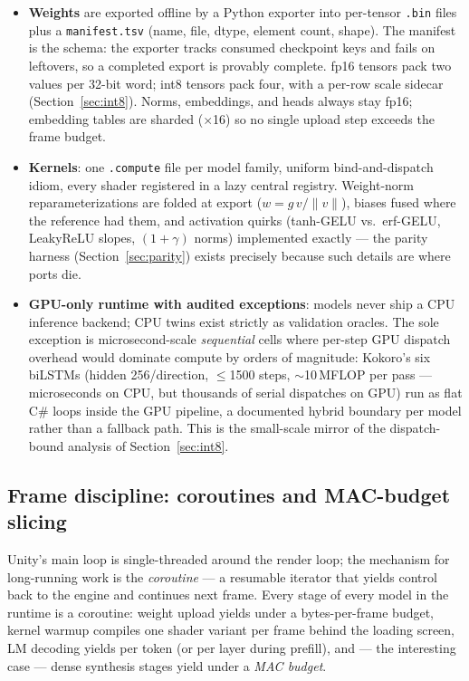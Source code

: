 \documentclass[11pt,a4paper]{article}
\newcommand{\code}[1]{\texttt{#1}}
\begin{document}
\begin{itemize}[leftmargin=2em]
\item \textbf{Weights} are exported offline by a Python exporter into per-tensor
\code{.bin} files plus a \code{manifest.tsv} (name, file, dtype, element count, shape).
The manifest is the schema: the exporter tracks consumed checkpoint keys and fails on
leftovers, so a completed export is provably complete. fp16 tensors pack two values per
32-bit word; int8 tensors pack four, with a per-row scale sidecar
(Section~\ref{sec:int8}). Norms, embeddings, and heads always stay fp16; embedding
tables are sharded ($\times$16) so no single upload step exceeds the frame budget.
\item \textbf{Kernels}: one \code{.compute} file per model family, uniform
bind-and-dispatch idiom, every shader registered in a lazy central registry. Weight-norm
reparameterizations are folded at export ($w = g\,v / \lVert v \rVert$), biases fused
where the reference had them, and activation quirks (tanh-GELU vs.\ erf-GELU, LeakyReLU
slopes, $(1{+}\gamma)$ norms) implemented exactly --- the parity harness
(Section~\ref{sec:parity}) exists precisely because such details are where ports die.
\item \textbf{GPU-only runtime with audited exceptions}: models never ship a CPU
inference backend; CPU twins exist strictly as validation oracles. The sole exception is
microsecond-scale \emph{sequential} cells where per-step GPU dispatch overhead would
dominate compute by orders of magnitude: Kokoro's six biLSTMs (hidden 256/direction,
$\le$1500 steps, $\sim$10\,MFLOP per pass --- microseconds on CPU, but thousands of
serial dispatches on GPU) run as flat C\# loops inside the GPU pipeline, a documented
hybrid boundary per model rather than a fallback path. This is the small-scale mirror
of the dispatch-bound analysis of Section~\ref{sec:int8}.
\end{itemize}

\subsection{Frame discipline: coroutines and MAC-budget slicing}
\label{sec:slicing}

Unity's main loop is single-threaded around the render loop; the mechanism for
long-running work is the \emph{coroutine} --- a resumable iterator that yields control
back to the engine and continues next frame. Every stage of every model in the runtime
is a coroutine: weight upload yields under a bytes-per-frame budget, kernel warmup
compiles one shader variant per frame behind the loading screen, LM decoding yields per
token (or per layer during prefill), and --- the interesting case --- dense synthesis
stages yield under a \emph{MAC budget}.
\end{document}
